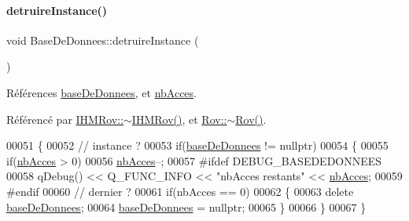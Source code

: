 \paragraph{\texorpdfstring{detruire\+Instance()}{detruireInstance()}}
{\footnotesize\ttfamily void Base\+De\+Donnees\+::detruire\+Instance (\begin{DoxyParamCaption}{ }\end{DoxyParamCaption})\hspace{0.3cm}{\ttfamily [static]}}



Références \hyperlink{class_base_de_donnees_a822ba0b7cf85b1e48ced8efd3d65e266}{base\+De\+Donnees}, et \hyperlink{class_base_de_donnees_a5099ecb2922bb31d84cd5d4505298a29}{nb\+Acces}.



Référencé par \hyperlink{class_i_h_m_rov_ab861463889934a3b6083b7a29c6adf45}{I\+H\+M\+Rov\+::$\sim$\+I\+H\+M\+Rov()}, et \hyperlink{class_rov_a6e41f712195b9af74fd75b781745d1b5}{Rov\+::$\sim$\+Rov()}.


\begin{DoxyCode}
00051 \{
00052     \textcolor{comment}{// instance ?}
00053     \textcolor{keywordflow}{if}(\hyperlink{class_base_de_donnees_a822ba0b7cf85b1e48ced8efd3d65e266}{baseDeDonnees} != \textcolor{keyword}{nullptr})
00054     \{
00055         \textcolor{keywordflow}{if}(\hyperlink{class_base_de_donnees_a5099ecb2922bb31d84cd5d4505298a29}{nbAcces} > 0)
00056             \hyperlink{class_base_de_donnees_a5099ecb2922bb31d84cd5d4505298a29}{nbAcces}--;
00057 \textcolor{preprocessor}{        #ifdef DEBUG\_BASEDEDONNEES}
00058         qDebug() << Q\_FUNC\_INFO << \textcolor{stringliteral}{"nbAcces restants"} << \hyperlink{class_base_de_donnees_a5099ecb2922bb31d84cd5d4505298a29}{nbAcces};
00059 \textcolor{preprocessor}{        #endif}
00060         \textcolor{comment}{// dernier ?}
00061         \textcolor{keywordflow}{if}(nbAcces == 0)
00062         \{
00063             \textcolor{keyword}{delete} \hyperlink{class_base_de_donnees_a822ba0b7cf85b1e48ced8efd3d65e266}{baseDeDonnees};
00064             \hyperlink{class_base_de_donnees_a822ba0b7cf85b1e48ced8efd3d65e266}{baseDeDonnees} = \textcolor{keyword}{nullptr};
00065         \}
00066     \}
00067 \}
\end{DoxyCode}
\mbox{\label{class_base_de_donnees_a00388973f3ec42e5c8e76e7af7e124b2}} 
